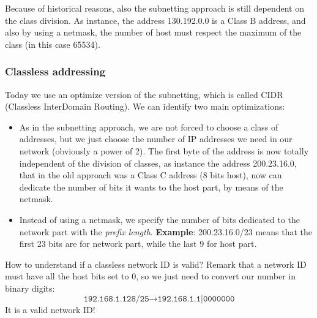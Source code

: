 Because of historical reasons, also the subnetting approach is still dependent on the class division. As instance, the address 130.192.0.0 is a Class B address, and also by using a netmask, the number of host must respect the maximum of the class (in this case 65534).

\subsubsection{Classless addressing}
Today we use an optimize version of the subnetting, which is called CIDR (Classless InterDomain Routing). We can identify two main optimizations:
\begin{itemize}
    \item As in the subnetting approach, we are not forced to choose a class of addresses, but we just choose the number of IP addresses we need in our network (obviously a power of 2). The first byte of the address is now totally independent of the division of classes, as instance the address 200.23.16.0, that in the old approach was a Class C address (8 bits host), now can dedicate the number of bits it wants to the host part, by means of the netmask.
    \item Instead of using a netmask, we specify the number of bits dedicated to the network part with the \textit{prefix length}. \textbf{Example}: 200.23.16.0/23 means that the first 23 bits are for network part, while the last 9 for host part.
\end{itemize}

\noindent How to understand if a classless network ID is valid? Remark that a network ID must have all the host bits set to 0, so we just need to convert our number in binary digits:
\[\texttt{192.168.1.128/25}\rightarrow \texttt{192.168.1.1|0000000}\]
It is a valid network ID!

